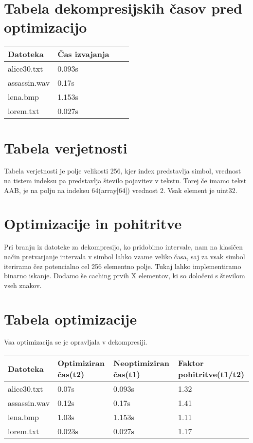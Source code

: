 \documentclass[12pt,a4paper]{article}
\begin{document}
\section{Tabela dekompresijskih časov pred optimizacijo}
\begin{table}[H]
    \begin{tabular}{llll}
    Datoteka     & Čas izvajanja \\ \hline
    alice30.txt  & 0.093s              \\
    assassin.wav & 0.17s                      \\
    lena.bmp     & 1.153s              \\
    lorem.txt    & 0.027s                           \\
    \end{tabular}
\end{table}
\section{Tabela verjetnosti}
Tabela verjetnosti je polje velikosti 256, kjer index predstavlja simbol,
vrednost na tistem indeksu pa predstavlja število pojavitev v tekstu. Torej če imamo tekst AAB, je na polju na indeksu 64(array[64]) vrednost 2.
Vsak element je uint32.
\section{Optimizacije in pohitritve}
Pri branju iz datoteke za dekompresijo, ko pridobimo intervale, nam na klasičen način pretvarjanje intervala v simbol lahko vzame veliko časa, saj za vsak simbol iteriramo čez potencialno cel 256 elementno polje. Tukaj lahko implementiramo binarno iskanje. Dodamo še caching prvih X elementov, ki so določeni s številom vseh znakov.
\section{Tabela optimizacije}

Vsa optimizacija se je opravljala v dekompresiji.

\begin{table}[H]
    \begin{tabular}{llll}
    Datoteka     & Optimiziran čas(t2)     & Neoptimiziran čas(t1) & Faktor pohitritve(t1/t2) \\ \hline
    alice30.txt  & 0.07s  & 0.093s        & 1.32            \\
    assassin.wav & 0.12s  & 0.17s        & 1.41       \\
    lena.bmp     & 1.03s  & 1.153s        & 1.11           \\
    lorem.txt    & 0.023s  & 0.027s        & 1.17          \\
    \end{tabular}
\end{table}
\end{document}

